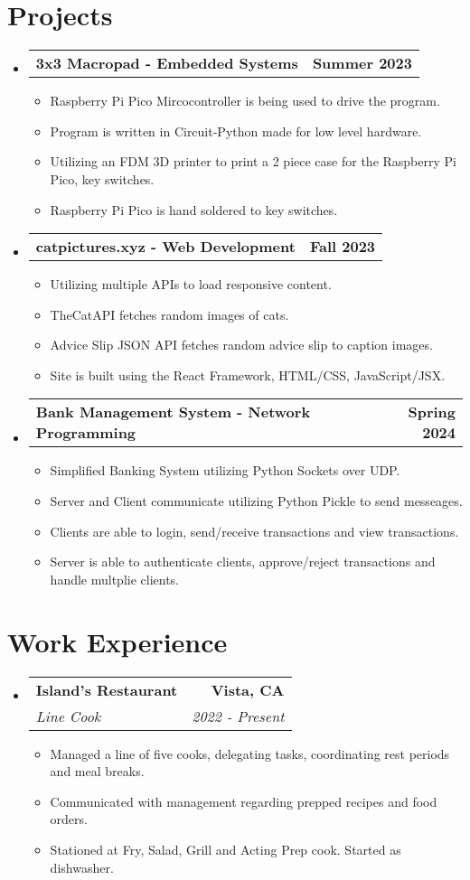 \documentclass[letterpaper,11pt]{article}
\makeatletter
\newcommand{\resumeItem}[1]{
  \item\small{
    {#1 \vspace{-3pt}}
  }
}
\newcommand{\resumeSubheading}[4]{
  \vspace{-3pt}\item
    \begin{tabular*}{1.0\textwidth}[t]{l@{\extracolsep{\fill}}r}
      \textbf{#1} & \textbf{\small #2} \\
      \textit{\small#3} & \textit{\small #4} \\
    \end{tabular*}\vspace{-7pt}
}
\newcommand{\resumeProjectHeading}[2]{
  \vspace{-3pt}\item
    \begin{tabular*}{1.0\textwidth}[t]{l@{\extracolsep{\fill}}r}
      \textbf{#1} & \textbf{\small #2} \\
    \end{tabular*}\vspace{-7pt}
}
\newcommand{\resumeSubHeadingListStart}{\begin{itemize}[leftmargin=0.0in, label={}]}
\newcommand{\resumeSubHeadingListEnd}{\end{itemize}}
\newcommand{\resumeItemListStart}{\begin{itemize}}
\newcommand{\resumeItemListEnd}{\end{itemize}\vspace{0pt}}
\makeatother
\begin{document}
\section{Projects} 
    \resumeSubHeadingListStart
        \resumeProjectHeading
        {3x3 Macropad - Embedded Systems}
        {Summer 2023}
        \resumeItemListStart
            \resumeItem{Raspberry Pi Pico Mircocontroller is being used to drive the program.}
            \resumeItem{Program is written in Circuit-Python made for low level hardware.}
            \resumeItem{Utilizing an FDM 3D printer to print a 2 piece case for the Raspberry Pi Pico, key switches.}
            \resumeItem{Raspberry Pi Pico is hand soldered to key switches.}
        \resumeItemListEnd
        \resumeProjectHeading
        {catpictures.xyz - Web Development}
        {Fall 2023}
        \resumeItemListStart
            \resumeItem{Utilizing multiple APIs to load responsive content.}
            \resumeItem{TheCatAPI fetches random images of cats.}
            \resumeItem{Advice Slip JSON API fetches random advice slip to caption images.}
            \resumeItem{Site is built using the React Framework, HTML/CSS, JavaScript/JSX.}
        \resumeItemListEnd
        \resumeProjectHeading
        {Bank Management System - Network Programming}
        {Spring 2024}
        \resumeItemListStart
            \resumeItem{Simplified Banking System utilizing Python Sockets over UDP.}
            \resumeItem{Server and Client communicate utilizing Python Pickle to send messeages.}
            \resumeItem{Clients are able to login, send/receive transactions and view transactions.}
            \resumeItem{Server is able to authenticate clients, approve/reject transactions and handle multplie clients.}
        \resumeItemListEnd
        
    \resumeSubHeadingListEnd

\section{Work Experience}
    \resumeSubHeadingListStart
    
        \resumeSubheading
        {Island's Restaurant}{Vista, CA}
            {Line Cook}{2022 - Present}
            \resumeItemListStart
                \resumeItem{Managed a line of five cooks, delegating tasks, coordinating rest periods and meal breaks.}
                \resumeItem{Communicated with management regarding prepped recipes and food orders.}
                \resumeItem{Stationed at Fry, Salad, Grill and Acting Prep cook. Started as dishwasher.}
            \resumeItemListEnd
    \resumeSubHeadingListEnd
 
\end{document}
